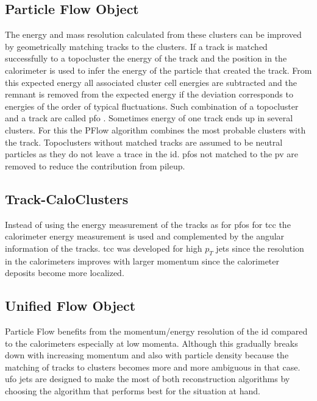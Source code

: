 \subsection{Particle Flow Object}
The energy and mass resolution calculated from these clusters can be improved by geometrically matching tracks to the clusters. If a track is matched successfully to a topocluster the energy of the track and the position in the calorimeter is used to infer the energy of the particle that created the track. From this expected energy all associated cluster cell energies are subtracted and the remnant is removed from the expected energy if the deviation corresponds to energies of the order of typical fluctuations. Such combination of a topocluster and a track are called \ac{pfo} \citep{aaboud2017jet}. Sometimes energy of one track ends up in several clusters. For this the PFlow algorithm combines the most probable clusters with the track. Topoclusters without matched tracks are assumed to be neutral particles as they do not leave a trace in the \ac{id}. \ac{pfo}s not matched to the \ac{pv} are removed to reduce the contribution from pileup.

\subsection{Track-CaloClusters}
Instead of using the energy measurement of the tracks as for \acp{pfo} for \ac{tcc} the calorimeter energy measurement is used and complemented by the angular information of the tracks. \ac{tcc} was developed for high $p_T$ jets since the resolution in the calorimeters improves with larger momentum since the calorimeter deposits become more localized.
 
\subsection{Unified Flow Object}
Particle Flow benefits from the momentum/energy resolution of the \ac{id} compared to the calorimeters especially at low momenta. Although this gradually breaks down with increasing momentum and also with particle density because the matching of tracks to clusters becomes more and more ambiguous in that case. \ac{ufo} jets are designed to make the most of both reconstruction algorithms by choosing the algorithm that performs best for the situation at hand.

